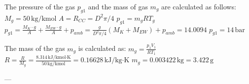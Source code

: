 The pressure of the gas \( p_{g1} \) and the mass of gas \( m_g \) are calculated as follows:  
\( M_g = 50 \, \text{kg/kmol} \)  
\( A = R_{CC} = D^2 \pi / 4 \)  
\( p_{g1} = m_g R T_g \)  
\( p_{g1} = \frac{M_K \cdot g}{A} + \frac{M_{EW} \cdot g}{A} + p_{amb} = \frac{g}{D^2 \pi / 4} (M_K + M_{EW}) + p_{amb} = 14.0094 \)  
\( p_{g1} = 14 \, \text{bar} \)  

The mass of the gas \( m_g \) is calculated as:  
\( m_g = \frac{p_1 V_1}{R T_1} \)  
\( R = \frac{R}{M_g} = \frac{8.314 \, \text{kJ/kmol·K}}{50 \, \text{kg/kmol}} = 0.16628 \, \text{kJ/kg·K} \)  
\( m_g = 0.003422 \, \text{kg} = 3.422 \, \text{g} \)  

---